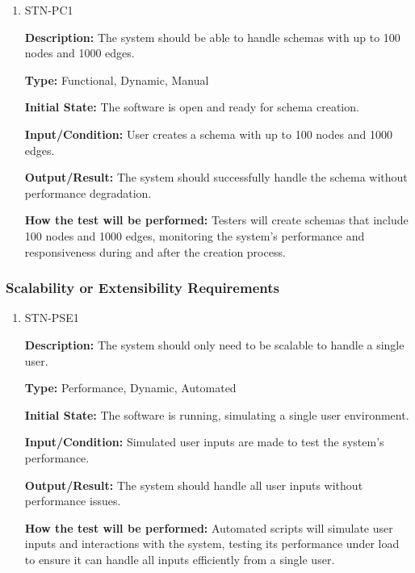 \documentclass[12pt, titlepage]{article}
\begin{document}
\begin{enumerate}

\item{STN-PC1\\}

\textbf{Description:} The system should be able to handle schemas with up to 100 nodes and 1000 edges.

\textbf{Type:} Functional, Dynamic, Manual

\textbf{Initial State:} The software is open and ready for schema creation.

\textbf{Input/Condition:} User creates a schema with up to 100 nodes and 1000 edges.

\textbf{Output/Result:} The system should successfully handle the schema without performance degradation.

\textbf{How the test will be performed:} Testers will create schemas that include 100 nodes and 1000 edges, monitoring the system’s performance and responsiveness during and after the creation process.

\end{enumerate}

\subsubsection{Scalability or Extensibility Requirements}

\begin{enumerate}

\item{STN-PSE1\\}

\textbf{Description:} The system should only need to be scalable to handle a single user.

\textbf{Type:} Performance, Dynamic, Automated

\textbf{Initial State:} The software is running, simulating a single user environment.

\textbf{Input/Condition:} Simulated user inputs are made to test the system’s performance.

\textbf{Output/Result:} The system should handle all user inputs without performance issues.

\textbf{How the test will be performed:} Automated scripts will simulate user inputs and interactions with the system, testing its performance under load to ensure it can handle all inputs efficiently from a single user.

\end{enumerate}
\end{document}
